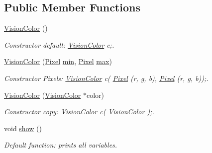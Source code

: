 \subsection*{Public Member Functions}
\begin{DoxyCompactItemize}
\item 
\hypertarget{structcommon_1_1VisionColor_a5c458feb1d92c624dff7e83a4bfa50e5}{\hyperlink{structcommon_1_1VisionColor_a5c458feb1d92c624dff7e83a4bfa50e5}{Vision\-Color} ()}\label{structcommon_1_1VisionColor_a5c458feb1d92c624dff7e83a4bfa50e5}

\begin{DoxyCompactList}\small\item\em Constructor default\-: \hyperlink{structcommon_1_1VisionColor}{Vision\-Color} c;. \end{DoxyCompactList}\item 
\hypertarget{structcommon_1_1VisionColor_a3552e22bbdf84cecdcfbe39d729be767}{\hyperlink{structcommon_1_1VisionColor_a3552e22bbdf84cecdcfbe39d729be767}{Vision\-Color} (\hyperlink{structcommon_1_1Pixel}{Pixel} \hyperlink{structcommon_1_1VisionColor_a3a8a40c24233df23f44510fce5846aaf}{min}, \hyperlink{structcommon_1_1Pixel}{Pixel} \hyperlink{structcommon_1_1VisionColor_adc2c9c3c09c9694f7ce8e9c8d94407bd}{max})}\label{structcommon_1_1VisionColor_a3552e22bbdf84cecdcfbe39d729be767}

\begin{DoxyCompactList}\small\item\em Constructor Pixels\-: \hyperlink{structcommon_1_1VisionColor}{Vision\-Color} c( \hyperlink{structcommon_1_1Pixel}{Pixel} (r, g, b), \hyperlink{structcommon_1_1Pixel}{Pixel} (r, g, b));. \end{DoxyCompactList}\item 
\hypertarget{structcommon_1_1VisionColor_a547481e4da9d02d44c2687c36a7de4b9}{\hyperlink{structcommon_1_1VisionColor_a547481e4da9d02d44c2687c36a7de4b9}{Vision\-Color} (\hyperlink{structcommon_1_1VisionColor}{Vision\-Color} $\ast$color)}\label{structcommon_1_1VisionColor_a547481e4da9d02d44c2687c36a7de4b9}

\begin{DoxyCompactList}\small\item\em Constructor copy\-: \hyperlink{structcommon_1_1VisionColor}{Vision\-Color} c( Vision\-Color );. \end{DoxyCompactList}\item 
\hypertarget{structcommon_1_1VisionColor_ab566eab8f4f6dda505e423bdaffc7d27}{void \hyperlink{structcommon_1_1VisionColor_ab566eab8f4f6dda505e423bdaffc7d27}{show} ()}\label{structcommon_1_1VisionColor_ab566eab8f4f6dda505e423bdaffc7d27}

\begin{DoxyCompactList}\small\item\em Default function\-: prints all variables. \end{DoxyCompactList}\end{DoxyCompactItemize}
